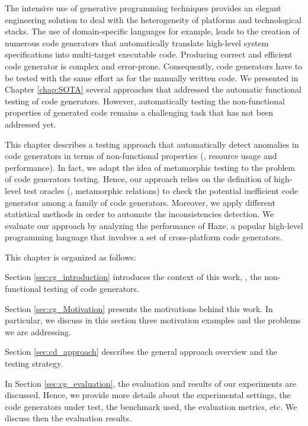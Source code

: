 
The intensive use of generative programming techniques provides an elegant engineering solution to deal with the heterogeneity of platforms and technological stacks. The use of domain-specific languages for example, leads to the creation of numerous code generators that automatically translate high-level system specifications into multi-target executable code. Producing correct and efficient code generator is complex and error-prone. Consequently, code generators have to be tested with the same effort as for the manually written code.
We presented in Chapter \ref{chap:SOTA} several approaches that addressed the automatic functional testing of code generators. However, automatically testing the non-functional properties of generated code remains a challenging task that has not been addressed yet.

This chapter describes a testing approach that automatically detect anomalies in code generators in terms of non-functional properties (\ie, resource usage and performance). In fact, we adapt the idea of metamorphic testing to the problem of code generators testing. Hence, our approach relies on the definition of high-level test oracles (\ie, metamorphic relations) to check the potential inefficient code generator among a family of code generators. Moreover, we apply different statistical methods in order to automate the inconsistencies detection.
We evaluate our approach by analyzing the performance of Haxe, a popular high-level programming language that involves a set of cross-platform code generators. 

This chapter is organized as follows: 

Section \ref{sec:cg_introduction} introduces the context of this work, \ie, the non-functional testing of code generators.

Section \ref{sec:cg_Motivation} presents the motivations behind this work. In particular, we discuss in this section three motivation examples and the problems we are addressing.

Section \ref{sec:cd_approach} describes the general approach overview and the testing strategy.

In Section \ref{sec:cg_evaluation}, the evaluation and results of our experiments are discussed. Hence, we provide more details about the experimental settings, the code generators under test, the benchmark used, the evaluation metrics, etc. We discuss then the evaluation results.

